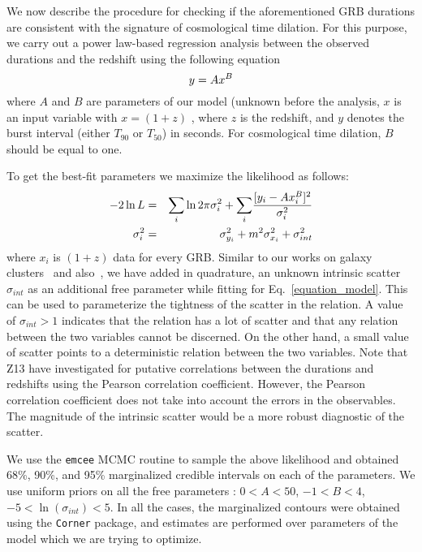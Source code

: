 \documentclass[prd,nofootinbib,preprintnumbers,floatfix]{revtex4}  %
\begin{document}
We now describe the procedure for checking if the aforementioned GRB durations   are consistent with the signature of   cosmological time dilation.  For this purpose, we carry out a  power law-based regression analysis between  the observed durations and the redshift using the following  equation
\begin{equation}
   \centering
    y=A x^{B}
    \label{equation_model}
\end{equation}
where $A$ and $B$ are parameters of our model (unknown before the analysis, $x$ is an input variable with $x=(1+z)$ , where $z$ is the redshift, and $y$ denotes the burst interval (either $T_{90}$ or $T_{50}$) in seconds. For cosmological time dilation, $B$ should be equal to one.

To get the best-fit parameters we maximize the likelihood as follows:
\begin{eqnarray}
-2\ln L &=& \large{\sum_i} \ln 2\pi\sigma_i^2 + \large{\sum_i} \frac{[y_i-Ax_i^B]^2}{\sigma_i^2}
\label{eq:eq8}  \\
\sigma_i^2 &=& \sigma_{y_i}^2+m^2\sigma_{x_i}^2+\sigma_{int}^2\nonumber
\end{eqnarray}
where $x_i$ is $(1+z)$ data for every GRB. Similar to our works on galaxy clusters~\cite{Gopika_2020,Pradyumna,Bora_feb} and also~\cite{Tian}, we have added in quadrature, an unknown intrinsic scatter $\sigma_{int}$ as an additional free parameter while fitting for Eq.~\ref{equation_model}. This can be used to parameterize  the tightness of the scatter in the relation. A value of $\sigma_{int} > 1$ indicates that the relation has a lot of scatter  and that any relation between the two variables cannot be discerned. On the other hand, a small value of scatter points to a deterministic relation between the two variables. Note that Z13 have investigated for putative correlations between the durations and redshifts using the Pearson correlation coefficient. However, the Pearson correlation coefficient does not take into account the errors in the observables. The magnitude of the intrinsic scatter would be a more robust diagnostic of the scatter.

We use the {\tt emcee} MCMC routine \cite{foreman2013emcee} to sample the above likelihood and obtained 68\%, 90\%, and 95\% marginalized credible intervals on each of the parameters. We use uniform priors on all the free parameters : $0<A<50$, $-1<B<4$, $-5<\ln(\sigma_{int})<5$.
In all the cases, the marginalized contours were obtained using the {\tt Corner} package, and estimates are performed over parameters of the model which we are trying to optimize.  
\end{document}
